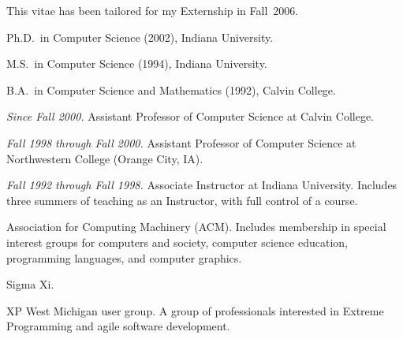 \documentclass[ComputerScience]{vita}
\begin{document}
\begin{vita}


This vitae has been tailored for my Externship in Fall~2006.


\begin{Degrees}
\item Ph.D.\ in Computer Science (2002), Indiana University.
\item M.S.\ in Computer Science (1994), Indiana University.
\item B.A.\ in Computer Science and Mathematics (1992), Calvin College.
\end{Degrees}




\begin{Experience}

\item \emph{Since Fall 2000.}  Assistant Professor of Computer
  Science at Calvin College.

\item \emph{Fall 1998 through Fall 2000.}  Assistant Professor of
  Computer Science at Northwestern College (Orange City, IA).

\item \emph{Fall 1992 through Fall 1998.}  Associate Instructor at
  Indiana University.  Includes three summers of teaching as an
  Instructor, with full control of a course.


\end{Experience}

\begin{Memberships}

\item Association for Computing Machinery (ACM).  Includes membership in special interest groups for computers and society, computer science education, programming languages, and computer graphics.


\item Sigma Xi.

\item XP West Michigan user group.  A group of professionals interested in Extreme Programming and agile software development.


\end{Memberships}
\end{vita}
\end{document}
